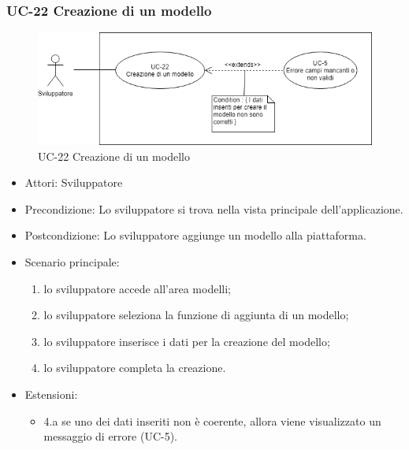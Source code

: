 	\subsubsection{UC-22 Creazione di un modello}
		\begin{figure}[h]
			\centering
			\includegraphics[scale=0.7]{images/UC-22.png}
				\caption{UC-22 Creazione di un modello}
		\end{figure}			
		\begin{itemize}
			\item Attori: Sviluppatore
			\item Precondizione: Lo sviluppatore si trova nella vista principale dell'applicazione.
			\item Postcondizione: Lo sviluppatore aggiunge un modello alla piattaforma.
			\item Scenario principale:
			\begin{enumerate}
				\item lo sviluppatore accede all'area modelli;
				\item lo sviluppatore seleziona la funzione di aggiunta di un modello;
				\item lo sviluppatore inserisce i dati per la creazione del modello;
				\item lo sviluppatore completa la creazione.
			\end{enumerate}
			\item Estensioni:
				\begin{itemize}
					\item 4.a se uno dei dati inseriti non è coerente, allora viene visualizzato un messaggio di errore (UC-5).
				\end{itemize}
		\end{itemize}
